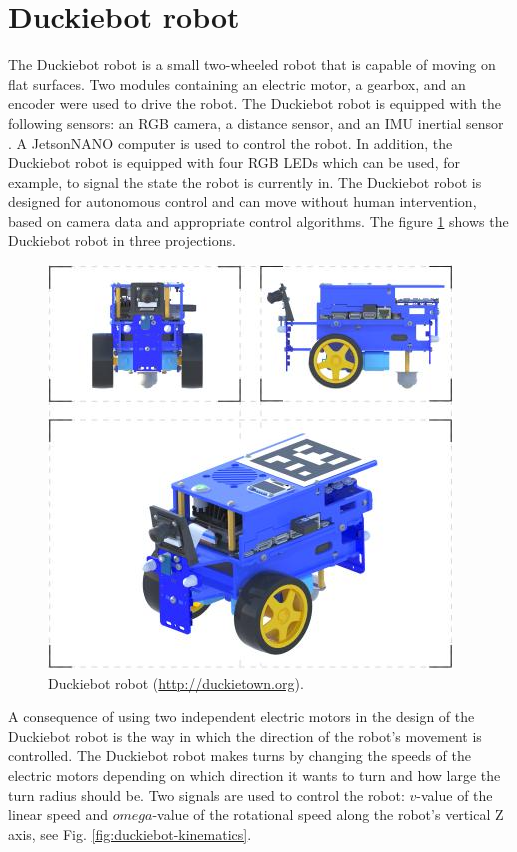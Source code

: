 \documentclass[conference]{IEEEtran}
\begin{document}
\section{Duckiebot robot}\label{sec:robot-duckiebot}
The Duckiebot robot is a small two-wheeled robot that is capable of moving on flat surfaces. Two modules containing an electric motor, a gearbox, and an encoder were used to drive the robot. The Duckiebot robot is equipped with the following sensors: an RGB camera, a distance sensor, and an IMU inertial sensor \cite{gupta2022low}. A JetsonNANO computer is used to control the robot. In addition, the Duckiebot robot is equipped with four RGB LEDs which can be used, for example, to signal the state the robot is currently in. The Duckiebot robot is designed for autonomous control and can move without human intervention, based on camera data and appropriate control algorithms. The figure \ref{fig:duckiebot-3d} shows the Duckiebot robot in three projections.

\begin{figure}[h]
    \centering
    \includegraphics[width=.9\columnwidth]{duckiebot-blue-3d}
    \caption{Duckiebot robot (\url{http://duckietown.org}).}
    \label{fig:duckiebot-3d}
\end{figure}

A consequence of using two independent electric motors in the design of the Duckiebot robot is the way in which the direction of the robot's movement is controlled.
The Duckiebot robot makes turns by changing the speeds of the electric motors depending on which direction it wants to turn and how large the turn radius should be.
Two signals are used to control the robot: $v$-value of the linear speed and $omega$-value of the rotational speed along the robot's vertical Z axis, see Fig. \ref{fig:duckiebot-kinematics}.
\end{document}
